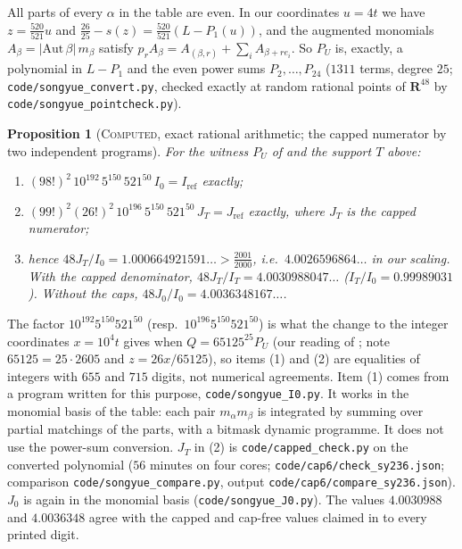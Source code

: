 \documentclass[11pt]{amsart}
\newtheorem{proposition}[theorem]{Proposition}
\theoremstyle{definition}
\theoremstyle{remark}
\newcommand{\lbl}[1]{\textup{\textsc{#1}}}
\begin{document}
All parts of every $\alpha$ in the table are even. In our coordinates $u=4t$
we have $z=\frac{520}{521}u$ and
$\frac{26}{25}-s(z)=\frac{520}{521}(L-P_1(u))$, and the augmented monomials
$A_\beta=|\mathrm{Aut}\,\beta|\,m_\beta$ satisfy
$p_rA_\beta=A_{(\beta,r)}+\sum_iA_{\beta+r e_i}$. So $P_U$ is, exactly, a
polynomial in $L-P_1$ and the even power sums $P_2,\dots,P_{24}$ ($1311$
terms, degree $25$; \texttt{code/songyue\_convert.py}, checked exactly at
random rational points of $\mathbf{R}^{48}$ by \texttt{code/songyue\_pointcheck.py}).

\begin{proposition}[\lbl{Computed}, exact rational arithmetic; the capped numerator by two independent programs]\label{prop:sy-exact}
For the witness $P_U$ of \cite{SY26} and the support $T$ above:
\begin{enumerate}
\item $(98!)^2\,10^{192}\,5^{150}\,521^{50}\,I_0=I_{\mathrm{ref}}$ exactly;
\item $(99!)^2(26!)^2\,10^{196}\,5^{150}\,521^{50}\,J_T=J_{\mathrm{ref}}$ exactly,
where $J_T$ is the capped numerator;
\item hence $48J_T/I_0=1.000664921591\ldots>\frac{2001}{2000}$, i.e.\
$4.0026596864\ldots$ in our scaling. With the capped denominator,
$48J_T/I_T=4.0030988047\ldots$ ($I_T/I_0=0.99989031$). Without the caps,
$48J_0/I_0=4.0036348167\ldots$.
\end{enumerate}
\end{proposition}
\begin{sloppypar}
The factor $10^{192}5^{150}521^{50}$ (resp.\ $10^{196}5^{150}521^{50}$) is
what the change to the integer coordinates $x=10^4t$ gives when
$Q=65125^{25}P_U$ (our reading of \cite[Eq.~(71)]{SY26}; note
$65125=25\cdot2605$ and $z=26x/65125$), so items (1) and (2) are
equalities of integers with $655$ and $715$ digits, not numerical agreements.
Item (1) comes from a program written for this purpose,
\texttt{code/songyue\_I0.py}. It works in the monomial basis of the table:
each pair $m_\alpha m_\beta$ is integrated by summing over partial matchings of
the parts, with a bitmask dynamic programme. It does not use the power-sum
conversion. $J_T$ in (2) is \texttt{code/capped\_check.py} on the converted
polynomial ($56$ minutes on four cores; \texttt{code/cap6/check\_sy236.json};
comparison \texttt{code/songyue\_compare.py}, output
\texttt{code/cap6/compare\_sy236.json}). $J_0$ is again in the monomial basis
(\texttt{code/songyue\_J0.py}). The values $4.0030988$ and $4.0036348$ agree
with the capped and cap-free values claimed in \cite{Kin26} to every printed
digit.
\end{sloppypar}
\end{document}
